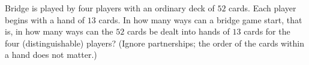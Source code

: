 Bridge is played by four players with an ordinary deck of $52$ cards. Each player begins with a hand of $13$ cards. In how many ways can a bridge game start, that is, in how many ways can the $52$ cards be dealt into hands of $13$ cards for the four (distinguishable) players? (Ignore partnerships; the order of the cards within a hand does not matter.)
